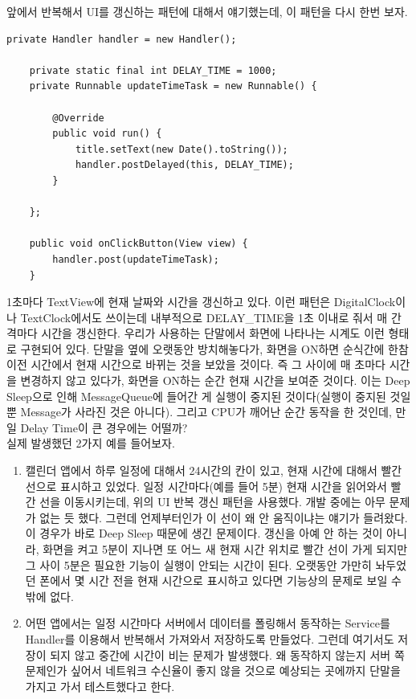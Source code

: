 앞에서 반복해서 UI를 갱신하는 패턴에 대해서 얘기했는데, 이 패턴을 다시 한번 보자.
\begin{lstlisting}[frame=single, caption=Deep Sleep 대응 필요, label=src:DefaultUpdateTime] 
  	private Handler handler = new Handler();

	private static final int DELAY_TIME = 1000;
	private Runnable updateTimeTask = new Runnable() {

		@Override
		public void run() {
			title.setText(new Date().toString());
			handler.postDelayed(this, DELAY_TIME);
		}

	};

	public void onClickButton(View view) {
		handler.post(updateTimeTask);
	}
\end{lstlisting}
1초마다 TextView에 현재 날짜와 시간을 갱신하고 있다.
이런 패턴은 DigitalClock이나 TextClock에서도 쓰이는데 내부적으로 DELAY\_TIME을 1초 이내로 줘서 매 간격마다 시간을 갱신한다. 
우리가 사용하는 단말에서 화면에 나타나는 시계도 이런 형태로 구현되어 있다.
단말을 옆에 오랫동안 방치해놓다가, 화면을 ON하면 순식간에 한참 이전 시간에서 현재 시간으로 바뀌는 것을 보았을 것이다. 
즉 그 사이에 매 초마다 시간을 변경하지 않고 있다가, 화면을 ON하는 순간 현재 시간을 보여준 것이다.
이는 Deep Sleep으로 인해 MessageQueue에 들어간 게 실행이 중지된 것이다(실행이 중지된 것일 뿐 Message가 사라진 것은 아니다).
그리고 CPU가 깨어난 순간 동작을 한 것인데, 만일 Delay Time이 큰 경우에는 어떨까?\\

실제 발생했던 2가지 예를 들어보자.
\begin{enumerate}
\item 캘린더 앱에서 하루 일정에 대해서 24시간의 칸이 있고, 현재 시간에 대해서 빨간 선으로 표시하고 있었다. 
일정 시간마다(예를 들어 5분) 현재 시간을 읽어와서 빨간 선을 이동시키는데, 위의 UI 반복 갱신 패턴을 사용했다.
개발 중에는 아무 문제가 없는 듯 했다. 그런데 언제부터인가 이 선이 왜 안 움직이냐는 얘기가 들려왔다.
이 경우가 바로 Deep Sleep 때문에 생긴 문제이다. 
갱신을 아예 안 하는 것이 아니라, 화면을 켜고 5분이 지나면 또 어느 새 현재 시간 위치로 빨간 선이 가게 되지만 그 사이 5분은 필요한 기능이 실행이 안되는 시간이 된다.
오랫동안 가만히 놔두었던 폰에서 몇 시간 전을 현재 시간으로 표시하고 있다면 기능상의 문제로 보일 수 밖에 없다.

\item 어떤 앱에서는 일정 시간마다 서버에서 데이터를 폴링해서 동작하는 Service를 Handler를 이용해서 반복해서 가져와서 저장하도록 만들었다. 그런데 여기서도 저장이 되지 않고 중간에 시간이 비는 문제가 발생했다. 왜 동작하지 않는지 서버 쪽 문제인가 싶어서 네트워크 수신율이 좋지 않을 것으로 예상되는 곳에까지 단말을 가지고 가서 테스트했다고 한다.
\end{enumerate}

